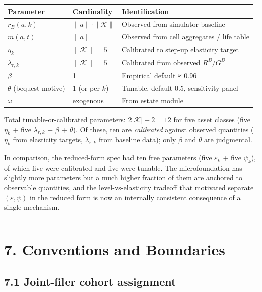 \documentclass[11pt]{article}
\begin{document}
\begin{center}
\begin{tabular}{|l|l|l|}
\hline
Parameter & Cardinality & Identification \\
\hline
$r_B(a, k)$ & $\|a\| \cdot \|\mathcal{K}\|$ & Observed from simulator baseline \\
\hline
$m(a, t)$ & $\|a\|$ & Observed from cell aggregates / life table \\
\hline
$\eta_k$ & $\|\mathcal{K}\| = 5$ & Calibrated to step-up elasticity target \\
\hline
$\lambda_{r,k}$ & $\|\mathcal{K}\| = 5$ & Calibrated from observed $R^B / G^B$ \\
\hline
$\beta$ & 1 & Empirical default ≈ 0.96 \\
\hline
$\theta$ (bequest motive) & 1 (or per-$k$) & Tunable, default 0.5, sensitivity panel \\
\hline
$\omega$ & exogenous & From estate module \\
\hline
\end{tabular}
\end{center}

Total tunable-or-calibrated parameters: $2|\mathcal{K}| + 2 = 12$ for five asset classes (five $\eta_k$ + five $\lambda_{r,k}$ + $\beta$ + $\theta$). Of these, ten are \emph{calibrated} against observed quantities ($\eta_k$ from elasticity targets, $\lambda_{r,k}$ from baseline data); only $\beta$ and $\theta$ are judgmental.

In comparison, the reduced-form spec had ten free parameters (five $\varepsilon_k$ + five $\psi_k$), of which five were calibrated and five were tunable. The microfoundation has slightly more parameters but a much higher fraction of them are anchored to observable quantities, and the level-vs-elasticity tradeoff that motivated separate $(\varepsilon,
\psi)$ in the reduced form is now an internally consistent consequence of a single mechanism.

\par\medskip\hrule\medskip

\section*{7. Conventions and Boundaries}

\subsection*{7.1 Joint-filer cohort assignment}
\end{document}

